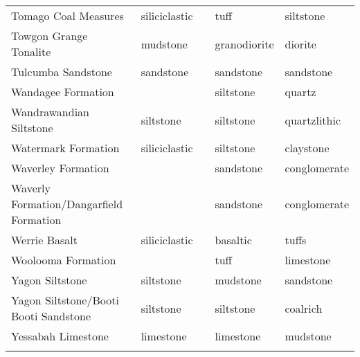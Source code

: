 \begin{tiny}
\begin{longtable}{p{5cm} l l l l}
    Tomago Coal Measures & siliciclastic &  & tuff & siltstone \\ 
    Towgon Grange Tonalite & mudstone &  & granodiorite & diorite \\ 
    Tulcumba Sandstone & sandstone &  & sandstone & sandstone \\ 
    Wandagee Formation &  &  & siltstone & quartz \\ 
    Wandrawandian Siltstone & siltstone &  & siltstone & quartzlithic \\ 
    Watermark Formation & siliciclastic &  & siltstone & claystone \\ 
    Waverley Formation &  &  & sandstone & conglomerate \\ 
    Waverly Formation/Dangarfield  Formation &  &  & sandstone & conglomerate \\ 
    Werrie Basalt & siliciclastic &  & basaltic & tuffs \\ 
    Woolooma Formation &  &  & tuff & limestone \\ 
    Yagon Siltstone & siltstone &  & mudstone & sandstone \\ 
    Yagon Siltstone/Booti Booti Sandstone & siltstone &  & siltstone & coalrich \\ 
    Yessabah Limestone & limestone &  & limestone & mudstone \\ 
    \hline
    \label{tab:form_lith}
  \end{longtable}
\end{tiny}

